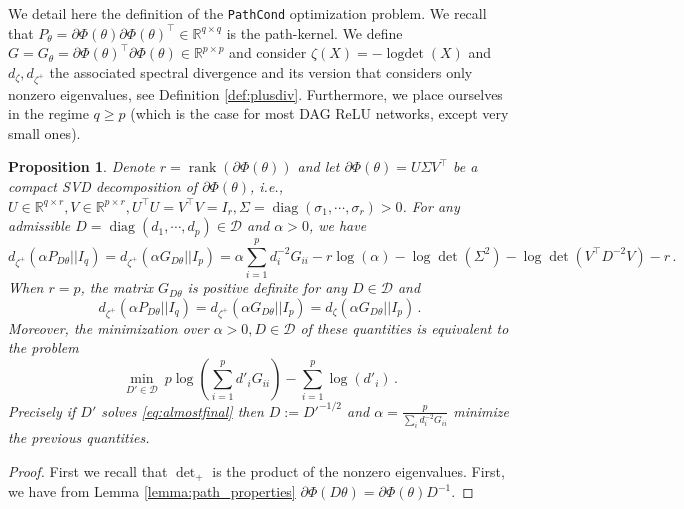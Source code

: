 \documentclass{article}
\theoremstyle{plain}
\newtheorem{proposition}[theorem]{Proposition}
\theoremstyle{definition}
\theoremstyle{remark}
\def\Dcal{\mathcal{D}}
\def\diag{\text{diag}}
\def\logdet{\operatorname{logdet}}
\def\diag{\operatorname{diag}}
\def\rank{\operatorname{rank}}
\def\R{{\mathbb{R}}}
\def\pathcond{{\texttt{PathCond} }}
\def\Dcal{{\mathcal{D}}}
\begin{document}
{We detail here the definition of the \pathcond optimization problem. We recall that $P_\theta = \partial \Phi(\theta) \partial \Phi(\theta)^\top \in \R^{q \times q}$ is the path-kernel. 
We define $G = G_\theta = \partial \Phi(\theta)^\top \partial \Phi(\theta) \in \R^{p \times p}$ 
and consider $\zeta(X) = -\logdet(X)$ and $d_\zeta, d_{\zeta^+}$ the associated spectral divergence 
and its version that considers only nonzero eigenvalues, see Definition \ref{def:plusdiv}. 
Furthermore, we place ourselves in the regime $q \geq p$ (which is the case for most DAG ReLU networks, except very small ones).

\begin{proposition}
\label{prop:equiv_convex_problem}
Denote $r = \rank(\partial \Phi(\theta))$ and let $\partial \Phi(\theta) = U \Sigma V^\top$ be a compact SVD decomposition of $\partial \Phi(\theta)$, i.e., 
$U \in \R^{q \times r}, V \in \R^{p \times r}, U^\top U = V^\top V = I_r, \Sigma = \diag(\sigma_1, \cdots, \sigma_r) > 0$.
For any admissible $D = \diag(d_1, \cdots, d_p) \in \Dcal$ and $\alpha > 0$, we have  
\begin{equation}\label{eq:FirstFormula}
    d_{\zeta^+}(\alpha P_{D \theta}|| I_q) = d_{\zeta^+}(\alpha G_{D \theta}|| I_p)  
    = 
\alpha
    \sum_{i=1}^p d_i^{-2} G_{ii} 
    - r \log(
\alpha
    ) - \log {\det}(\Sigma^2) - \log {\det}(V^\top D^{-2} V)  - r\,.
\end{equation}
When $r = p$, the matrix $G_{D \theta}$ is positive definite for any $D \in \Dcal$ and 
\begin{equation}\label{eq:DetDivFullRank}
    d_{\zeta^+}(\alpha P_{D \theta}|| I_q) 
=  d_{\zeta^{+}}(\alpha G_{D \theta}|| I_p) 
    = d_{\zeta}(\alpha G_{D \theta}|| I_p)\,.
\end{equation}
Moreover, the minimization over $\alpha > 0, D\in \Dcal$ of these quantities is equivalent  to the problem
 \begin{equation}
    \label{eq:almostfinal}
    \min_{D'\in \Dcal} \ p \log(\sum_{i=1}^p d'_i G_{ii}) - \sum_{i = 1}^p \log(d'_i)\,.
\end{equation}
Precisely if $D'$ solves \eqref{eq:almostfinal} then 
$D := D'^{-1/2}$ and  $\alpha = \frac{p}{\sum_i d^{-2}_i G_{ii}}$
minimize the previous quantities.
\end{proposition}
\begin{proof}
First we recall that ${\det}_+$ is the product of the nonzero eigenvalues. 
First, we have from Lemma \ref{lemma:path_properties} $\partial \Phi(D\theta) = \partial \Phi(\theta) D^{-1}$.

\end{proof}}
\end{document}
